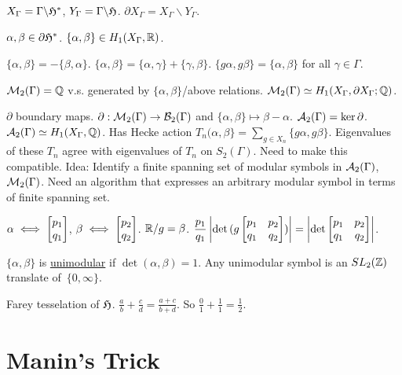 \documentclass[]{article}
\begin{document}
$X_\Gamma = \Gamma \backslash \frak{H}^*$, $Y_\Gamma = \Gamma\backslash \frak{H}$.
$\partial X_\Gamma = X_\Gamma \backslash Y_\Gamma$.

$\alpha,\beta\in \partial \frak{H}^*$.
$\{\alpha,\beta\} \in H_1(X_\Gamma,\mathbb{R})$.

$\{\alpha,\beta\} = -\{\beta,\alpha\}$. $\{\alpha,\beta\} = \{\alpha,\gamma\} + \{\gamma,\beta\}$. $\{g\alpha,g\beta\} = \{\alpha,\beta\}$ for all $\gamma\in\Gamma$.

$\mathcal{M}_2(\Gamma) = \mathbb{Q}$ v.s. generated by $\{\alpha,\beta\}$/above relations. $\mathcal{M}_2(\Gamma) \simeq H_1(X_\Gamma,\partial X_\Gamma;\mathbb{Q})$.

$\partial$ boundary maps. $\partial: \mathcal{M}_2(\Gamma) \rightarrow \mathcal{B}_2(\Gamma)$ and $\{\alpha,\beta\} \mapsto \beta-\alpha$. $\mathcal{A}_2(\Gamma) = \ker\partial$. $\mathcal{A}_2(\Gamma) \simeq H_1(X_\Gamma,\mathbb{Q})$. Has Hecke action $T_n(\alpha,\beta\} = \sum_{g\in X_n}\{g\alpha,g\beta\}$.
Eigenvalues of these $T_n$ agree with eigenvalues of $T_n$ on $S_2(\Gamma)$. Need to make this compatible. Idea: Identify a finite spanning set of modular symbols in $\mathcal{A}_2(\Gamma)$, $\mathcal{M}_2(\Gamma)$. Need an algorithm that expresses an arbitrary modular symbol in terms of finite spanning set.

$\alpha \iff \begin{bmatrix}p_1\\q_1\end{bmatrix}$, $\beta \iff \begin{bmatrix}p_2\\q_2\end{bmatrix}$. $\mathbb{R}/g = \beta$. $\displaystyle\frac{p_1}{q_1} \left|\det{(g\begin{bmatrix}p_1&p_2\\q_1&q_2\end{bmatrix})}\right| = \left|\det{\begin{bmatrix}p_1&p_2\\q_1&q_2\end{bmatrix}}\right|$. 

\begin{definition}
	$\{\alpha,\beta\}$ is \ul{unimodular} if $\det{(\alpha,\beta)} = 1$. Any unimodular symbol is an $SL_2(\mathbb{Z})$ translate of~$\{0,\infty\}$. 
\end{definition}

Farey tesselation of $\frak{H}$. $\frac{a}{b} + \frac{c}{d} = \frac{a+c}{b+d}$. So $\frac{0}{1} + \frac{1}{1} = \frac{1}{2}$.

\section*{Manin's Trick}
\end{document}
